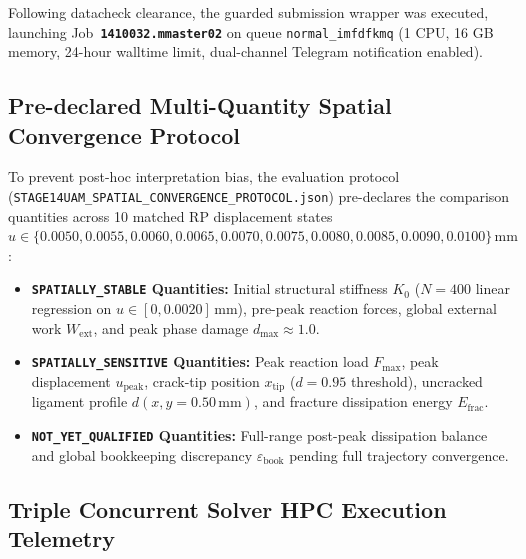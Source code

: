 Following datacheck clearance, the guarded submission wrapper was executed, launching Job~\textbf{\texttt{1410032.mmaster02}} on queue \texttt{normal\_imfdfkmq} (1 CPU, 16 GB memory, 24-hour walltime limit, dual-channel Telegram notification enabled).

\subsection{Pre-declared Multi-Quantity Spatial Convergence Protocol}
\label{subsec:stage14uam_protocol}

To prevent post-hoc interpretation bias, the evaluation protocol (\texttt{STAGE14UAM\_SPATIAL\_CONVERGENCE\_PROTOCOL.json}) pre-declares the comparison quantities across 10 matched RP displacement states $u \in \{0.0050, 0.0055, 0.0060, 0.0065, 0.0070, 0.0075, 0.0080, 0.0085, 0.0090, 0.0100\}\,\mathrm{mm}$:
\begin{itemize}
  \item \textbf{\texttt{SPATIALLY\_STABLE} Quantities:} Initial structural stiffness $K_0$ ($N=400$ linear regression on $u \in [0, 0.0020]\,\mathrm{mm}$), pre-peak reaction forces, global external work $W_{\mathrm{ext}}$, and peak phase damage $d_{\max} \approx 1.0$.
  \item \textbf{\texttt{SPATIALLY\_SENSITIVE} Quantities:} Peak reaction load $F_{\max}$, peak displacement $u_{\mathrm{peak}}$, crack-tip position $x_{\mathrm{tip}}$ ($d = 0.95$ threshold), uncracked ligament profile $d(x, y=0.50\,\mathrm{mm})$, and fracture dissipation energy $E_{\mathrm{frac}}$.
  \item \textbf{\texttt{NOT\_YET\_QUALIFIED} Quantities:} Full-range post-peak dissipation balance and global bookkeeping discrepancy $\varepsilon_{\mathrm{book}}$ pending full trajectory convergence.
\end{itemize}

\subsection{Triple Concurrent Solver HPC Execution Telemetry}
\label{subsec:stage14uam_triple_telemetry}

